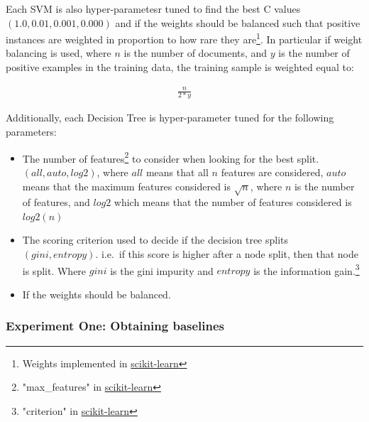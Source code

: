 Each SVM is also hyper-parametesr tuned to find the best C values    $(1.0, 0.01, 0.001, 0.000)$ and if the  weights should be balanced such that positive instances are weighted in proportion to how rare they are\footnote{Weights implemented in  \href{https://scikit-learn.org/stable/modules/generated/sklearn.utils.class_weight.compute_class_weight.html}{scikit-learn}}. In particular if weight balancing is used, where $n$ is the number of documents, and $y$ is the number of positive examples in the training data, the training sample is weighted equal to:


\begin{align}
\frac{n}{2 * y} 
\end{align}


Additionally, each Decision Tree  is hyper-parameter tuned for the following parameters:
	
\begin{itemize}
	\item The number of features\footnote{"max\_features" in \href{https://scikit-learn.org/stable/modules/generated/sklearn.tree.DecisionTreeClassifier.html}{scikit-learn}} to consider when looking for the best split. $(all, auto, log2)$, where $all$ means that all $n$ features are considered,  $auto$ means that the maximum features considered is $\sqrt{n}$, where $n$ is the number of features, and $log2$ which means that the number of features considered is $log2(n)$
	\item The scoring criterion used to decide if the decision tree splits $(gini, entropy)$. i.e.\ if this score is higher after a node split, then that node is split. Where $gini$ is the gini impurity and $entropy$ is the information gain.\footnote{"criterion" in \href{https://scikit-learn.org/stable/modules/generated/sklearn.tree.DecisionTreeClassifier.html}{scikit-learn}}
	\item If the  weights should be balanced.
\end{itemize} 


\subsubsection{Experiment One: Obtaining baselines}\label{ch3:ex1}


